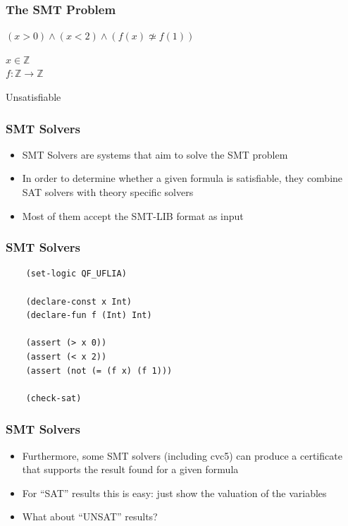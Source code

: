 \documentclass[usepdftitle=false,aspectratio=169,usenames,dvipsnames]{beamer}
\newcommand\vitem{\vfill\item}
\begin{document}
\begin{frame}
  \frametitle{The SMT Problem}
  \begin{overprint}
    \medskip
    \begin{center}
      $(x > 0) \wedge (x < 2) \wedge (f(x) \not\simeq f(1))$

      $x \in \mathbb{Z}$ \\

      $f : \mathbb{Z} \rightarrow \mathbb{Z}$
    \end{center}
  \end{overprint}
  \vfill
  \begin{overprint}
    \begin{center}
      \color{red}Unsatisfiable
    \end{center}
  \end{overprint}
\end{frame}

\begin{frame}
  \frametitle{SMT Solvers}
  \begin{itemize}
    \item SMT Solvers are systems that aim to solve the SMT problem
    \vitem In order to determine whether a given formula is satisfiable, they combine SAT solvers with theory specific solvers
    \vitem Most of them accept the SMT-LIB format as input
  \end{itemize}
\end{frame}

\begin{frame}[fragile]
  \frametitle{SMT Solvers}
  \begin{verbatim}
    (set-logic QF_UFLIA)

    (declare-const x Int)
    (declare-fun f (Int) Int)

    (assert (> x 0))
    (assert (< x 2))
    (assert (not (= (f x) (f 1)))

    (check-sat)
  \end{verbatim}
\end{frame}

\begin{frame}
  \frametitle{SMT Solvers}
  \begin{itemize}
    \item Furthermore, some SMT solvers (including cvc5) can produce a certificate that supports the result found for a given formula
    \vitem For ``SAT'' results this is easy: just show the valuation of the variables
    \vitem What about ``UNSAT'' results?
  \end{itemize}
\end{frame}
\end{document}
